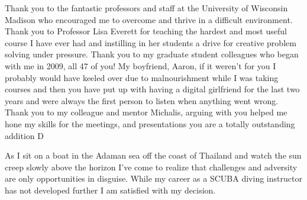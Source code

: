 Thank you to the fantastic professors and staff at the University of Wisconsin Madison 
who encouraged me to overcome and thrive in a difficult environment.
Thank you to Professor Lisa Everett for teaching the hardest and most useful course I have ever had and
instilling in her students a drive for creative problem solving under pressure. 
Thank you to my graduate student colleagues who began with me in 2009, all 47 of you! 
My boyfriend, Aaron, if it weren't for you I probably would have keeled over due 
to malnourishment while I was taking courses and then you have put up with 
having a digital girlfriend for the last two years and
were always the first person to listen when anything went wrong.
Thank you to my colleague and mentor Michalis, arguing with you helped me hone my
skills for the meetings, and presentations you are a totally outstanding addition D%

As I sit on a boat in the Adaman sea off the coast of Thailand and watch the sun creep 
slowly above the horizon I've come to realize that challenges and adversity 
are only opportunities in disguise.
While my career as a SCUBA diving instructor has not developed further I am
satisfied with my decision. 